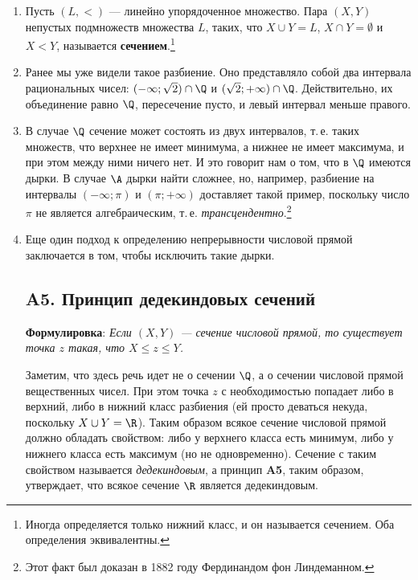 \begin{enumerate}
\item Пусть $(L,<)$ --- линейно упорядоченное множество. Пара $(X,Y)$ непустых подмножеств множества $L$, таких, что  $X\cup Y=L$, $X\cap Y=\emptyset$ и $X<Y$, называется \textbf{сечением}.\footnote{Иногда определяется только нижний класс, и он называется сечением. Оба определения эквивалентны.}
\item Ранее мы уже видели такое разбиение. Оно представляло собой два интервала рациональных чисел: $(-\infty;\sqrt 2)\cap\Q$ и $(\sqrt 2;+\infty)\cap\Q$. Действительно, их объединение равно $\Q$, пересечение пусто, и левый интервал меньше правого.
\item В случае $\Q$ сечение может состоять из двух интервалов, т.\,е. таких множеств, что верхнее не имеет минимума, а нижнее не имеет максимума, и при этом между ними ничего нет. И это говорит нам о том, что в $\Q$ имеются дырки. В случае $\A$ дырки найти сложнее, но, например, разбиение на интервалы $(-\infty;\pi)$ и $(\pi;+\infty)$ доставляет такой пример, поскольку число $\pi$ не является алгебраическим, т.\,е. \textit{трансцендентно}.\footnote{Этот факт был доказан в 1882 году Фердинандом фон Линдеманном.}
\item Еще один подход к определению непрерывности числовой прямой заключается в том, чтобы исключить такие дырки.

\subsection*{A5. Принцип дедекиндовых сечений}

\noindent
\textbf{Формулировка}: \textit{Если $(X,Y)$ --- сечение числовой прямой, то существует точка $z$ такая, что $X\le z\le Y$.}

Заметим, что здесь речь идет не о сечении $\Q$, а о сечении числовой прямой вещественных чисел.
При этом точка $z$ с необходимостью попадает либо в верхний, либо в нижний класс разбиения (ей просто деваться некуда, поскольку $X\cup Y=\R$). Таким образом всякое сечение числовой прямой должно обладать свойством: либо у верхнего класса есть минимум, либо у нижнего класса есть максимум (но не одновременно). Сечение с таким свойством называется \textit{дедекиндовым}, а принцип \textbf{A5}, таким образом, утверждает, что всякое сечение $\R$ является дедекиндовым.


\end{enumerate}
